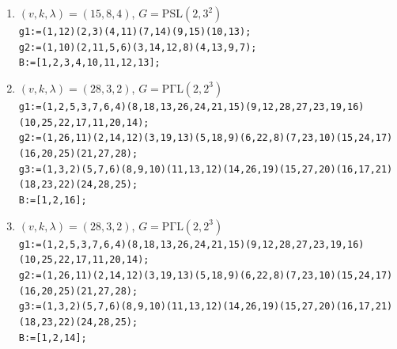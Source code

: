 \documentclass[a4paper,twopage,reqno,12pt]{amsart}
\theoremstyle{definition}
\numberwithin{equation}{section}
\newcommand{\PSL}{\mathrm{PSL}}
\newcommand{\PGaL}{\mathrm{P\Gamma L}}
\newcommand{\Aut}{\mathrm{Aut}}
\begin{document}
\begin{enumerate}
    \item\label{1584_2}$(v,k,\lambda)=(15,8,4)$, $G=\PSL(2,3^2)$\\
    \texttt{g1:=(1,12)(2,3)(4,11)(7,14)(9,15)(10,13);}\\
    \texttt{g2:=(1,10)(2,11,5,6)(3,14,12,8)(4,13,9,7);}\\
    \texttt{B:=[1,2,3,4,10,11,12,13];}\\

    \item\label{2832_1} $(v,k,\lambda)=(28,3,2)$, $G=\PGaL(2,2^3)$\\
    {\scriptsize \texttt{g1:=(1,2,5,3,7,6,4)(8,18,13,26,24,21,15)(9,12,28,27,23,19,16)(10,25,22,17,11,20,14);}\\
    \texttt{g2:=(1,26,11)(2,14,12)(3,19,13)(5,18,9)(6,22,8)(7,23,10)(15,24,17)(16,20,25)(21,27,28);}\\
    \texttt{g3:=(1,3,2)(5,7,6)(8,9,10)(11,13,12)(14,26,19)(15,27,20)(16,17,21)(18,23,22)(24,28,25);}}\\
    \texttt{B:=[1,2,16];}\\

\item\label{2832_2} $(v,k,\lambda)=(28,3,2)$, $G=\PGaL(2,2^3)$\\
    {\scriptsize \texttt{g1:=(1,2,5,3,7,6,4)(8,18,13,26,24,21,15)(9,12,28,27,23,19,16)(10,25,22,17,11,20,14);}\\
    \texttt{g2:=(1,26,11)(2,14,12)(3,19,13)(5,18,9)(6,22,8)(7,23,10)(15,24,17)(16,20,25)(21,27,28);}\\
    \texttt{g3:=(1,3,2)(5,7,6)(8,9,10)(11,13,12)(14,26,19)(15,27,20)(16,17,21)(18,23,22)(24,28,25);}}\\
    \texttt{B:=[1,2,14];}\\


\end{enumerate}
\end{document}
